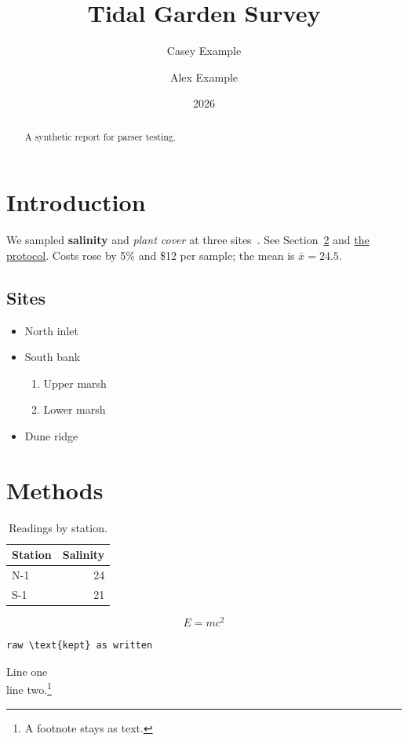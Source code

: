 \documentclass[11pt]{article}
\title{Tidal Garden Survey}
\author{Casey Example \and Alex Example}
\date{2026}
\begin{document}
\maketitle

\begin{abstract}
A synthetic report for parser testing.
\end{abstract}

\section{Introduction}\label{sec:intro}
We sampled \textbf{salinity} and \emph{plant cover} at three sites~\cite{survey2026}.
See Section~\ref{sec:methods} and \href{https://example.invalid}{the protocol}.
Costs rose by 5\% and \$12 per sample; %
the mean is $\bar{x} = 24.5$.

\subsection{Sites}
\begin{itemize}
  \item North inlet
  \item South bank
  \begin{enumerate}
    \item Upper marsh
    \item Lower marsh
  \end{enumerate}
  \item[Extra] Dune ridge
\end{itemize}

\section{Methods}\label{sec:methods}
\begin{table}[h]
\centering
\begin{tabular}{|l|r|}
\hline
Station & Salinity \\
\hline
N-1 & 24 \\
S-1 & 21 \\
\hline
\end{tabular}
\caption{Readings by station.}
\end{table}

\begin{equation}
  E = mc^2
\end{equation}

\begin{verbatim}
raw \text{kept} as written
\end{verbatim}

Line one\\
line two.\footnote{A footnote stays as text.}
\end{document}
